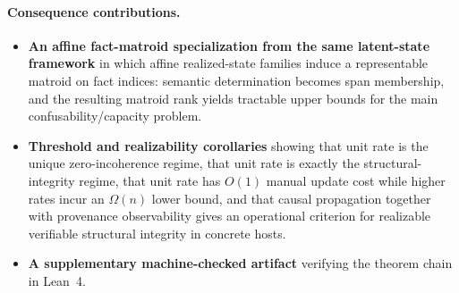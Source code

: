 \paragraph{Consequence contributions.}
\begin{itemize}
\tightlist
\item \textbf{An affine fact-matroid specialization from the same latent-state framework} in which affine realized-state families induce a representable matroid on fact indices: semantic determination becomes span membership, and the resulting matroid rank yields tractable upper bounds for the main confusability/capacity problem.
\item \textbf{Threshold and realizability corollaries} showing that unit rate is the unique zero-incoherence regime, that unit rate is exactly the structural-integrity regime, that unit rate has $O(1)$ manual update cost while higher rates incur an $\Omega(n)$ lower bound, and that causal propagation together with provenance observability gives an operational criterion for realizable verifiable structural integrity in concrete hosts.
\item \textbf{A supplementary machine-checked artifact} verifying the theorem chain in Lean~4.
\end{itemize}


